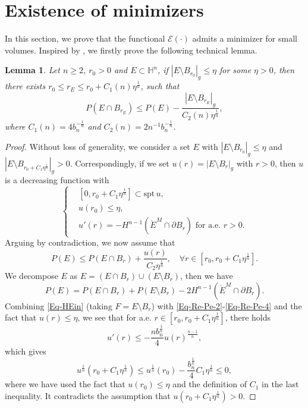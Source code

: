 \documentclass[11pt,reqno]{amsart}
\newtheorem{lem}[thm]{Lemma}
\theoremstyle{definition}
\theoremstyle{remark}
\numberwithin{equation}{section}
\renewcommand{\(}{\left(}
\renewcommand{\)}{\right)}
\renewcommand{\-}{\overline}
\begin{document}
\section{Existence of minimizers}\label{Sec-Existence}
In this section, we prove that the functional $\mathcal{E}(\cdot)$ admits a minimizer for small volumes. Inspired by \cite[Lemma 4.5]{Figalli15}, we firstly prove the following technical lemma.
\begin{lem}\label{Lem-Re-Pe}
	Let $n\geq 2$, $r_0>0$ and $E\subset\mathbb{H}^n$, if $|E\setminus B_{r_0}|_g\leq\eta$ for some $\eta>0$, then there exists $r_0\leq r_E\leq r_0+C_1(n)\eta^{\frac{1}{n}}$, such that
	\begin{equation}\label{Eq-Re-Pe-1}
		P(E\cap B_{r_E})\leq P(E)-\frac{|E\setminus B_{r_E}|_g}{C_2(n)\eta^{\frac{1}{n}}},
	\end{equation}
	where $C_1(n)=4 b_n^{-\frac{1}{n}}$ and $C_2(n)=2n^{-1}b_n^{-\frac{1}{n}}$.
\end{lem}
\begin{proof}
	Without loss of generality, we consider a set $E$ with $|E\setminus B_{r_0}|_g\leq\eta$ and $|E\setminus B_{r_0+C_1\eta^{\frac{1}{n}}}|_g>0$. Correspondingly, if we set $u(r)=|E\setminus B_r|_g$ with $r>0$, then $u$ is a decreasing function with 
	\begin{equation}\label{Eq-Re-Pe-2}
		\left\{\begin{aligned}
		&[0,r_0+C_1\eta^{\frac{1}{n}}]\subset \text{spt}\, u,\\
		&u(r_0)\leq\eta,\\
		&u'(r)=-H^{n-1}(\mathring{E}^M\cap\partial B_r)\,\, \text{for a.e.}\,\, r>0.
		\end{aligned}\right.
	\end{equation}
	Arguing by contradiction, we now assume that 
	\begin{equation}\label{Eq-Re-Pe-3}
		P(E)\leq P(E\cap B_{r})+\frac{u(r)}{C_2\eta^{\frac{1}{n}}},\quad \forall r\in[r_0,r_0+C_1\eta^{\frac{1}{n}}].
	\end{equation}
We decompose $E$ as $E=(E\cap B_r)\cup (E\setminus B_r)$, then we have 
\begin{equation}\label{Eq-Re-Pe-4}
	P(E)=P(E\cap B_r)+P(E\setminus B_r)-2H^{n-1}(\mathring{E}^M\cap\partial B_r).
\end{equation}
Combining \eqref{Eq-HEin} (taking $F=E\setminus B_r$) with \eqref{Eq-Re-Pe-2}-\eqref{Eq-Re-Pe-4} and the fact that $u(r)\leq\eta$, we see that for a.e. $r\in[r_0,r_0+C_1\eta^{\frac{1}{n}}]$, there holds
\begin{equation}
  u'(r)\leq-\frac{nb_n^{\frac{1}{n}}}{4}u(r)^{\frac{n-1}{n}},
\end{equation}
which gives
\begin{equation}
	u^{\frac{1}{n}}(r_0+C_1\eta^{\frac{1}{n}})\leq u^{\frac{1}{n}}(r_0)-\frac{b_n^{\frac{1}{n}}}{4}C_1\eta^{\frac{1}{n}}\leq 0,
\end{equation}
where we have used the fact that $u(r_0)\leq\eta$ and the definition of $C_1$ in the last inequality. It contradicts the assumption that $u(r_0+C_1\eta^{\frac{1}{n}})>0$.
\end{proof}
\end{document}
